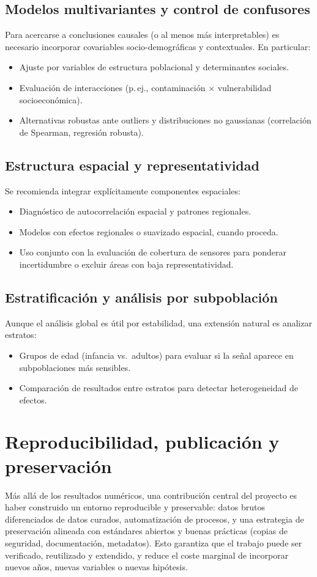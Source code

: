 \subsection{Modelos multivariantes y control de confusores}
Para acercarse a conclusiones causales (o al menos más interpretables) es necesario incorporar covariables
socio-demográficas y contextuales. En particular:
\begin{itemize}
  \item Ajuste por variables de estructura poblacional y determinantes sociales.
  \item Evaluación de interacciones (p.\,ej., contaminación $\times$ vulnerabilidad socioeconómica).
  \item Alternativas robustas ante outliers y distribuciones no gaussianas (correlación de Spearman, regresión robusta).
\end{itemize}

\subsection{Estructura espacial y representatividad}
Se recomienda integrar explícitamente componentes espaciales:
\begin{itemize}
  \item Diagnóstico de autocorrelación espacial y patrones regionales.
  \item Modelos con efectos regionales o suavizado espacial, cuando proceda.
  \item Uso conjunto con la evaluación de cobertura de sensores para ponderar incertidumbre o excluir áreas con baja
  representatividad.
\end{itemize}

\subsection{Estratificación y análisis por subpoblación}
Aunque el análisis global es útil por estabilidad, una extensión natural es analizar estratos:
\begin{itemize}
  \item Grupos de edad (infancia vs.\ adultos) para evaluar si la señal aparece en subpoblaciones más sensibles.
  \item Comparación de resultados entre estratos para detectar heterogeneidad de efectos.
\end{itemize}

\section{Reproducibilidad, publicación y preservación}
Más allá de los resultados numéricos, una contribución central del proyecto es haber construido un entorno
reproducible y preservable: datos brutos diferenciados de datos curados, automatización de procesos, y una
estrategia de preservación alineada con estándares abiertos y buenas prácticas (copias de seguridad, documentación,
metadatos). Esto garantiza que el trabajo puede ser verificado, reutilizado y extendido, y reduce el coste marginal
de incorporar nuevos años, nuevas variables o nuevas hipótesis.

